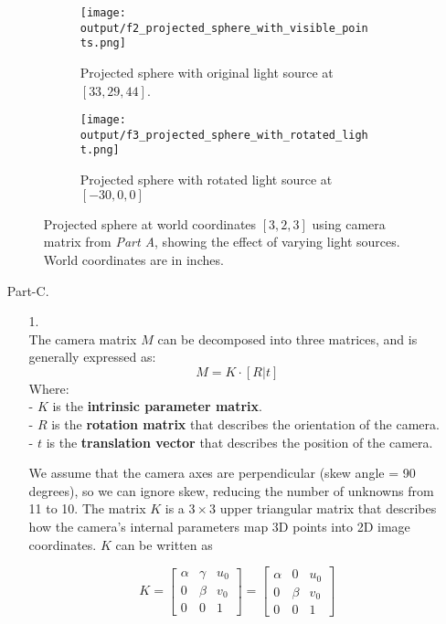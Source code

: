 \documentclass[12pt]{report}
\begin{document}
\begin{enumerate}
    \begin{figure}[!ht]\centering
        \hspace*{-1.2in}
        \begin{subfigure}{0.6\textwidth}
            \texttt{[image: output/f2\_projected\_sphere\_with\_visible\_points.png]}
            \caption{Projected sphere with original light source at $[33, 29, 44]$.}
            \label{fig:Figure2a}
        \end{subfigure}
    \vfil
        \hspace*{-1.2in}
        \begin{subfigure}{0.6\textwidth}
        \texttt{[image: output/f3\_projected\_sphere\_with\_rotated\_light.png]}
        \caption{Projected sphere with rotated light source at $[-30, 0, 0]$}
        \label{fig:Figure2b}
        \end{subfigure}
        \caption{Projected sphere at world coordinates $[3,2,3]$ using camera matrix from \emph{Part A}, 
        showing the effect of varying light sources. World coordinates are in inches.}
        \label{fig:Figure2}
    \end{figure}

    \FloatBarrier 

    \item[Part-C.]
    \ \\
    \begin{enumerate}
    \item[1.]
    \ \\
    The camera matrix \( M \) can be decomposed into three matrices, and is generally expressed as:
    $$
    M = K \cdot [R | t]
    $$
    Where:\\
    - \( K \) is the \textbf{intrinsic parameter matrix}.\\
    - \( R \) is the \textbf{rotation matrix} that describes the orientation of the camera.\\
    - \( t \) is the \textbf{translation vector} that describes the position of the camera.

    We assume that the camera axes are perpendicular (skew angle = 90 degrees), so we can ignore skew, reducing the number of unknowns from 11 to 10. The matrix 
    \( K \) is a \( 3 \times 3 \) upper triangular matrix that describes how the camera's internal parameters map 3D points into 2D image coordinates. \( K \) can 
    be written as

    $$
    K = \begin{bmatrix}
    \alpha & \gamma & u_0 \\
    0      & \beta  & v_0 \\
    0      & 0      & 1
    \end{bmatrix} = 
    \begin{bmatrix}
    \alpha & 0      & u_0 \\
    0      & \beta  & v_0 \\
    0      & 0      & 1
    \end{bmatrix}
    $$


\end{enumerate}
\end{enumerate}
\end{document}

